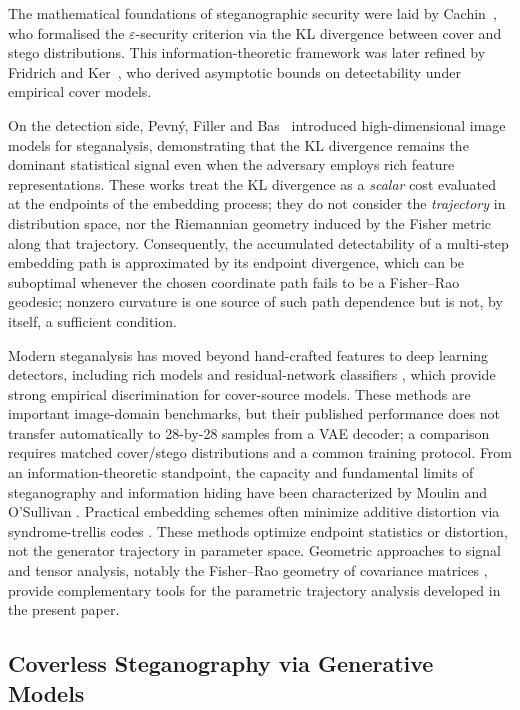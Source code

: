 \documentclass[a4paper,fleqn]{cas-dc}
\begin{document}
The mathematical foundations of steganographic security were laid by
Cachin~\cite{cachin1998information}, who formalised the $\varepsilon$-security
criterion via the KL divergence between cover and stego distributions.
This information-theoretic framework was later refined by Fridrich and
Ker~\cite{fridrich2009steganography}, who derived asymptotic bounds on
detectability under empirical cover models.

On the detection side, Pevn\'{y}, Filler and Bas~\cite{pevny2010using}
introduced high-dimensional image models for steganalysis, demonstrating
that the KL divergence remains the dominant statistical signal even when
the adversary employs rich feature representations.
These works treat the KL divergence as a \emph{scalar} cost evaluated at
the endpoints of the embedding process; they do not consider the
\emph{trajectory} in distribution space, nor the Riemannian geometry
induced by the Fisher metric along that trajectory.
Consequently, the accumulated detectability of a multi-step embedding
path is approximated by its endpoint divergence, which can be suboptimal whenever the chosen coordinate path fails to be a
Fisher--Rao geodesic; nonzero curvature is one source of such path dependence
but is not, by itself, a sufficient condition.

Modern steganalysis has moved beyond hand-crafted features to deep
learning detectors, including rich models \cite{fridrich2012rich} and
residual-network classifiers \cite{boroumand2019deep}, which provide
strong empirical discrimination for cover-source models.  These methods are
important image-domain benchmarks, but their published performance does not
transfer automatically to 28-by-28 samples from a VAE decoder; a comparison
requires matched cover/stego distributions and a common training protocol.
From an information-theoretic standpoint, the capacity and fundamental limits of
steganography and information hiding have been characterized by Moulin and
O'Sullivan \cite{moulin2003information}.  Practical embedding schemes often
minimize additive distortion via syndrome-trellis codes
\cite{filler2011minimizing}.  These methods optimize endpoint statistics or
distortion, not the generator trajectory in parameter space.  Geometric
approaches to signal and tensor analysis, notably the Fisher--Rao geometry
of covariance matrices \cite{pennec2006riemannian}, provide complementary
tools for the parametric trajectory analysis developed in the present paper.

\subsection{Coverless Steganography via Generative Models}
\end{document}
